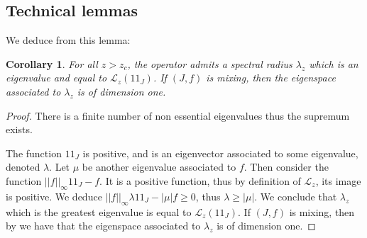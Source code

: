 \documentclass[11 pt]{article}
\newtheorem{corollary}[proposition]{Corollary}
\newcommand{\BBone}{{1\!\!1}}
\theoremstyle{definition}
\begin{document}
\subsection{Technical lemmas}
We deduce from this lemma:
\begin{corollary}\label{cor-spectre}
For all $z>z_c$, the operator admits a spectral radius $\lambda_z$ which is an eigenvalue and equal to $\mathcal L_z(\BBone_J)$. If $(J,f)$ is mixing, then the eigenspace associated to $\lambda_z$ is of dimension one.
\end{corollary}
\begin{proof}
There is a finite number of non essential eigenvalues thus the supremum exists.

The function $\BBone_J$ is positive, and is an eigenvector associated to some eigenvalue, denoted $\lambda$. Let $\mu$ be another eigenvalue associated to $f$. Then consider the function $||f||_\infty\BBone_J-f$. It is a positive function, thus by definition of $\mathcal L_z$, its image is positive. We deduce $||f||_\infty \lambda \BBone_J-|\mu| f\geq 0$, thus $\lambda\geq |\mu|$.
We conclude that $\lambda_z$ which is the greatest eigenvalue is equal to $\mathcal{L}_z(\BBone_J)$.
If $(J,f)$ is mixing, then by \cite{Baladi} we have that the eigenspace associated to $\lambda_z$ is of dimension one.

\end{proof}
\end{document}
